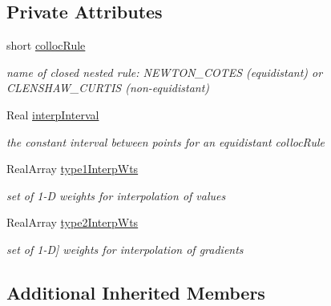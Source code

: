 \subsection*{Private Attributes}
\begin{DoxyCompactItemize}
\item 
short \hyperlink{classPecos_1_1PiecewiseInterpPolynomial_abcc1d84cc8e8c8b5a66f720067039f2e}{colloc\+Rule}\label{classPecos_1_1PiecewiseInterpPolynomial_abcc1d84cc8e8c8b5a66f720067039f2e}

\begin{DoxyCompactList}\small\item\em name of closed nested rule\+: N\+E\+W\+T\+O\+N\+\_\+\+C\+O\+T\+ES (equidistant) or C\+L\+E\+N\+S\+H\+A\+W\+\_\+\+C\+U\+R\+T\+IS (non-\/equidistant) \end{DoxyCompactList}\item 
Real \hyperlink{classPecos_1_1PiecewiseInterpPolynomial_a2d507685a12fe5fcb99384f9fb14c638}{interp\+Interval}\label{classPecos_1_1PiecewiseInterpPolynomial_a2d507685a12fe5fcb99384f9fb14c638}

\begin{DoxyCompactList}\small\item\em the constant interval between points for an equidistant colloc\+Rule \end{DoxyCompactList}\item 
Real\+Array \hyperlink{classPecos_1_1PiecewiseInterpPolynomial_a142635e1a0334e06cc17969f45121833}{type1\+Interp\+Wts}\label{classPecos_1_1PiecewiseInterpPolynomial_a142635e1a0334e06cc17969f45121833}

\begin{DoxyCompactList}\small\item\em set of 1-\/D weights for interpolation of values \end{DoxyCompactList}\item 
Real\+Array \hyperlink{classPecos_1_1PiecewiseInterpPolynomial_ae041c3717fb8258280964d7a37b2378c}{type2\+Interp\+Wts}\label{classPecos_1_1PiecewiseInterpPolynomial_ae041c3717fb8258280964d7a37b2378c}

\begin{DoxyCompactList}\small\item\em set of 1-\/D\mbox{]} weights for interpolation of gradients \end{DoxyCompactList}\end{DoxyCompactItemize}
\subsection*{Additional Inherited Members}


